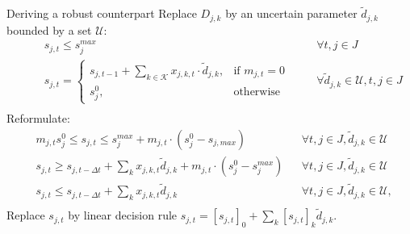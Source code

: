 \documentclass[slides]{beamer}
\begin{document}
\begin{frame}{Deriving a robust counterpart}
    \scriptsize
    Replace $D_{j,k}$ by an uncertain parameter $\tilde{d}_{j,k}$ bounded by a set $\mathcal{U}$:
    \vspace{-10pt}
    \begin{equation*}
    \begin{aligned}
    &
    && s_{j,t} \leq s_{j}^{max}
    &&& \forall t, j \in J\\
    &
    && s_{j,t} =
    \begin{cases}
    s_{j,t-1} + \sum_{k \in \mathcal{K}}{x_{j,k,t}\cdot \tilde{d}_{j,k}}, & \text{if } m_{j,t} = 0\\
    s_{j}^{0}, & \text{otherwise}
    \end{cases}
    &&& \forall \tilde{d}_{j,k} \in \mathcal{U}, t, j \in J\\
    \end{aligned}
    \end{equation*}
    \vspace{-5pt}
    Reformulate:
    \vspace{-5pt}
    \begin{equation*}
    \begin{aligned}
    & m_{j,t} s_{j}^{0} \leq s_{j,t} \leq s_{j}^{max} + m_{j,t} \cdot (s_{j}^{0} - s_{j,max})
    && \forall t, j \in J, \tilde{d}_{j,k} \in \mathcal{U}\\
    & s_{j,t} \geq s_{j,t-\Delta t} + \sum_{k}{x_{j,k,t}\tilde{d}_{j,k}} + m_{j,t} \cdot (s_{j}^{0} - s_{j}^{max})
    && \forall t, j \in J, \tilde{d}_{j,k} \in \mathcal{U}\\
    & s_{j,t} \leq s_{j,t-\Delta t} + \sum_{k}{x_{j,k,t}\tilde{d}_{j,k}}
    && \forall t, j \in J, \tilde{d}_{j,k} \in \mathcal{U},\\
    \end{aligned}
    \end{equation*}
Replace $s_{j,t}$ by linear decision rule $s_{j,t} = [s_{j,t}]_{0} + \sum_{k}{[s_{j,t}]_{k}\tilde{d}_{j,k}}$.
\end{frame}
\end{document}
